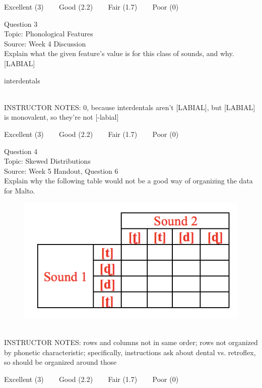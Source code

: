 \documentclass[12pt]{article}
\begin{document}
\vfill
Excellent (3) ~~~ Good (2.2) ~~~ Fair (1.7) ~~~ Poor (0)
\newpage

{\large Question 3}\\

Topic: Phonological Features\\
Source: Week 4 Discussion\\

Explain what the given feature’s value is for this class of sounds, and why.\\

{[LABIAL]}

interdentals


~\\
INSTRUCTOR NOTES: 0, because interdentals aren't [LABIAL], but [LABIAL] is monovalent, so they're not [-labial]


\vfill
Excellent (3) ~~~ Good (2.2) ~~~ Fair (1.7) ~~~ Poor (0)
\newpage

{\large Question 4}\\

Topic: Skewed Distributions\\
Source: Week 5 Handout, Question 6\\

Explain why the following table would not be a good way of organizing the data for Malto.\\

\begin{figure}[H]
\includegraphics{../images/Malto_table_bad.png}
\end{figure}

~\\
INSTRUCTOR NOTES: rows and columns not in same order; rows not organized by phonetic characteristic; specifically, instructions ask about dental vs. retroflex, so should be organized around those


\vfill
Excellent (3) ~~~ Good (2.2) ~~~ Fair (1.7) ~~~ Poor (0)
\newpage
\end{document}
